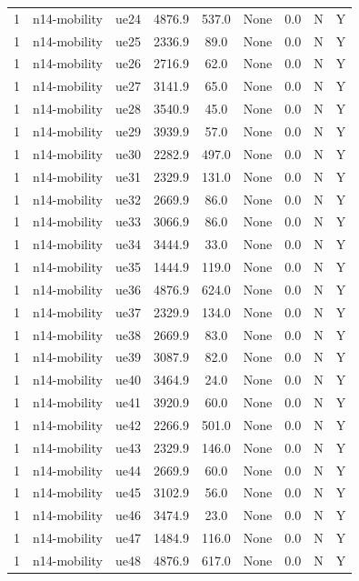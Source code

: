 \begin{table}[ht]
\begin{tabular}{|c|c|c|c|c|c|c|c|c|}
1 & n14-mobility & ue24 & 4876.9 & 537.0 & None & 0.0 & N & Y \\
1 & n14-mobility & ue25 & 2336.9 & 89.0 & None & 0.0 & N & Y \\
1 & n14-mobility & ue26 & 2716.9 & 62.0 & None & 0.0 & N & Y \\
1 & n14-mobility & ue27 & 3141.9 & 65.0 & None & 0.0 & N & Y \\
1 & n14-mobility & ue28 & 3540.9 & 45.0 & None & 0.0 & N & Y \\
1 & n14-mobility & ue29 & 3939.9 & 57.0 & None & 0.0 & N & Y \\
1 & n14-mobility & ue30 & 2282.9 & 497.0 & None & 0.0 & N & Y \\
1 & n14-mobility & ue31 & 2329.9 & 131.0 & None & 0.0 & N & Y \\
1 & n14-mobility & ue32 & 2669.9 & 86.0 & None & 0.0 & N & Y \\
1 & n14-mobility & ue33 & 3066.9 & 86.0 & None & 0.0 & N & Y \\
1 & n14-mobility & ue34 & 3444.9 & 33.0 & None & 0.0 & N & Y \\
1 & n14-mobility & ue35 & 1444.9 & 119.0 & None & 0.0 & N & Y \\
1 & n14-mobility & ue36 & 4876.9 & 624.0 & None & 0.0 & N & Y \\
1 & n14-mobility & ue37 & 2329.9 & 134.0 & None & 0.0 & N & Y \\
1 & n14-mobility & ue38 & 2669.9 & 83.0 & None & 0.0 & N & Y \\
1 & n14-mobility & ue39 & 3087.9 & 82.0 & None & 0.0 & N & Y \\
1 & n14-mobility & ue40 & 3464.9 & 24.0 & None & 0.0 & N & Y \\
1 & n14-mobility & ue41 & 3920.9 & 60.0 & None & 0.0 & N & Y \\
1 & n14-mobility & ue42 & 2266.9 & 501.0 & None & 0.0 & N & Y \\
1 & n14-mobility & ue43 & 2329.9 & 146.0 & None & 0.0 & N & Y \\
1 & n14-mobility & ue44 & 2669.9 & 60.0 & None & 0.0 & N & Y \\
1 & n14-mobility & ue45 & 3102.9 & 56.0 & None & 0.0 & N & Y \\
1 & n14-mobility & ue46 & 3474.9 & 23.0 & None & 0.0 & N & Y \\
1 & n14-mobility & ue47 & 1484.9 & 116.0 & None & 0.0 & N & Y \\
1 & n14-mobility & ue48 & 4876.9 & 617.0 & None & 0.0 & N & Y \\

\end{tabular}
\end{table}
